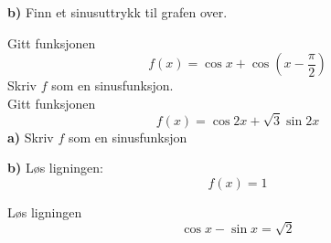 \textbf{b)} Finn et sinusuttrykk til grafen over.
\\
\ness

\op
Gitt funksjonen
\[ f(x) = \cos x + \cos \left(x-\frac{\pi}{2}\right) \]
Skriv $ f $ som en sinusfunksjon.\\

\op
Gitt funksjonen \[ f(x)=\cos 2x + \sqrt 3\sin 2x \]
\textbf{a)} Skriv $ f $ som en sinusfunksjon

\textbf{b)} Løs ligningen: \[  f(x)=1 \] 

\op
Løs ligningen
\[ \cos x - \sin x = \sqrt{2}  \]

